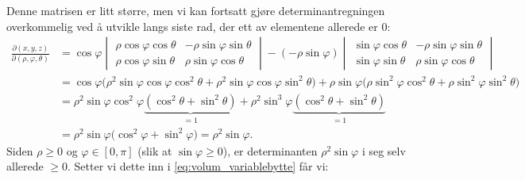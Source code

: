 Denne matrisen er litt større, men vi kan fortsatt gjøre determinantregningen overkommelig ved å utvikle langs siste rad, der ett av elementene allerede er $0$:
\begin{align*}
\frac{\partial(x,y,z)}{\partial(\rho,\varphi,\theta)}
&= \cos\varphi \begin{vmatrix} \rho\cos\varphi\cos\theta & -\rho\sin\varphi\sin\theta \\ \rho\cos\varphi\sin\theta & \rho\sin\varphi\cos\theta \end{vmatrix}
- (-\rho\sin\varphi) \begin{vmatrix} \sin\varphi\cos\theta & -\rho\sin\varphi\sin\theta \\ \sin\varphi\sin\theta & \rho\sin\varphi\cos\theta \end{vmatrix} \\
&= \cos\varphi\bigl(\rho^2\sin\varphi\cos\varphi\cos^2\theta + \rho^2\sin\varphi\cos\varphi\sin^2\theta\bigr) + \rho\sin\varphi\bigl(\rho\sin^2\varphi\cos^2\theta + \rho\sin^2\varphi\sin^2\theta\bigr) \\
&= \rho^2\sin\varphi\cos^2\varphi \underbrace{(\cos^2\theta+\sin^2\theta)}_{=1} + \rho^2\sin^3\varphi \underbrace{(\cos^2\theta+\sin^2\theta)}_{=1} \\
&= \rho^2\sin\varphi\bigl(\cos^2\varphi+\sin^2\varphi\bigr) = \rho^2\sin\varphi.
\end{align*}
Siden $\rho\geq 0$ og $\varphi\in[0,\pi]$ (slik at $\sin\varphi\geq 0$), er determinanten $\rho^2\sin\varphi$ i seg selv allerede $\geq 0$. Setter vi dette inn i \eqref{eq:volum_variablebytte} får vi:


